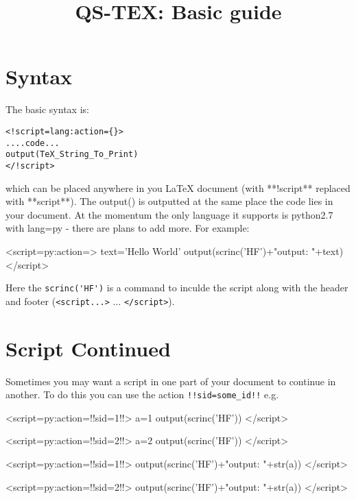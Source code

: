 \documentclass[a4paper,12pt,twocolum]{article}
\title{QS-TEX: Basic guide}
\begin{document}
\maketitle
\section{Syntax}
The basic syntax is:
\begin{lstlisting}
<!script=lang:action={}>
....code...
output(TeX_String_To_Print)
</!script>
\end{lstlisting}
which can be placed anywhere in you LaTeX document (with **!script** replaced with **script**). The output() is outputted at the same place the code lies in your document. At the momentum the only language it supports is python2.7 with lang=py - there are plans to add more. For example:

<script=py:action={}>
text='Hello World'
output(scrinc('HF')+"output: "+text)
</script>

Here the \lstinline{scrinc('HF')} is a command to inculde the script along with the header and footer (\lstinline{<script...>} ... \lstinline{</script>}).
\section{Script Continued}
Sometimes you may want a script in one part of your document to continue in another. To do this you can use the action \lstinline{!!sid=some_id!!} e.g.

<script=py:action={!!sid=1!!}>
a=1
output(scrinc('HF'))
</script>

<script=py:action={!!sid=2!!}>
a=2
output(scrinc('HF'))
</script>

<script=py:action={!!sid=1!!}>
output(scrinc('HF')+"output: "+str(a))
</script>

<script=py:action={!!sid=2!!}>
output(scrinc('HF')+"output: "+str(a))
</script>
\end{document}
